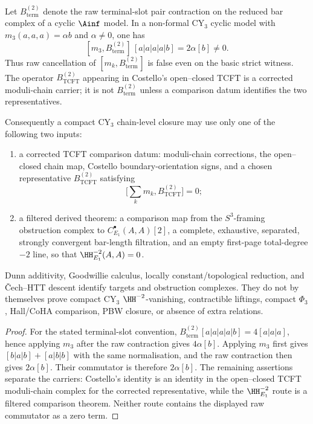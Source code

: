 \begin{proposition}
\label{prop:cy3-raw-bterm-two-closure-routes}
Let $B_{\mathrm{term}}^{(2)}$ denote the raw terminal-slot pair
contraction on the reduced bar complex of a cyclic $\Ainf$ model. In a
non-formal CY$_3$ cyclic model with
$m_3(a,a,a)=\alpha b$ and $\alpha\neq0$, one has
\[
 [m_3,B_{\mathrm{term}}^{(2)}]\,[a|a|a|a|b]
 =
 2\alpha [b]\neq0 .
\]
Thus raw cancellation of
$[m_k,B_{\mathrm{term}}^{(2)}]$ is false even on the basic strict
witness. The operator $B_{\mathrm{TCFT}}^{(2)}$ appearing in Costello's
open--closed TCFT is a corrected moduli-chain carrier; it is not
$B_{\mathrm{term}}^{(2)}$ unless a comparison datum identifies the two
representatives.

Consequently a compact CY$_3$ chain-level closure may use only one of
the following two inputs:
\begin{enumerate}[label=\textup{(\alph*)}]
\item a corrected TCFT comparison datum: moduli-chain corrections, the
open--closed chain map, Costello boundary-orientation signs, and a
chosen representative $B_{\mathrm{TCFT}}^{(2)}$ satisfying
\[
 \bigl[\sum_k m_k,B_{\mathrm{TCFT}}^{(2)}\bigr]=0;
\]
\item a filtered derived theorem: a comparison map from the
$S^3$-framing obstruction complex to
$C^\bullet_{E_1}(A,A)[2]$, a complete, exhaustive, separated,
strongly convergent bar-length filtration, and an empty first-page
total-degree $-2$ line, so that
$\HH^{-2}_{E_1}(A,A)=0$.
\end{enumerate}
Dunn additivity, Goodwillie calculus, locally constant/topological
reduction, and \v{C}ech--HTT descent identify targets and obstruction
complexes. They do not by themselves prove compact CY$_3$
$\HH^{-2}$-vanishing, contractible liftings, compact $\Phi_3$,
Hall/CoHA comparison, PBW closure, or absence of extra relations.
\end{proposition}

\begin{proof}
For the stated terminal-slot convention,
$B_{\mathrm{term}}^{(2)}[a|a|a|a|b]=4[a|a|a]$, hence applying $m_3$
after the raw contraction gives $4\alpha[b]$. Applying $m_3$ first gives
$[b|a|b]+[a|b|b]$ with the same normalisation, and the raw contraction
then gives $2\alpha[b]$. Their commutator is therefore
$2\alpha[b]$. The remaining assertions separate the carriers:
Costello's identity is an identity in the open--closed TCFT moduli-chain
complex for the corrected representative, while the
$\HH^{-2}_{E_1}$ route is a filtered comparison theorem. Neither route
contains the displayed raw commutator as a zero term.
\end{proof}


